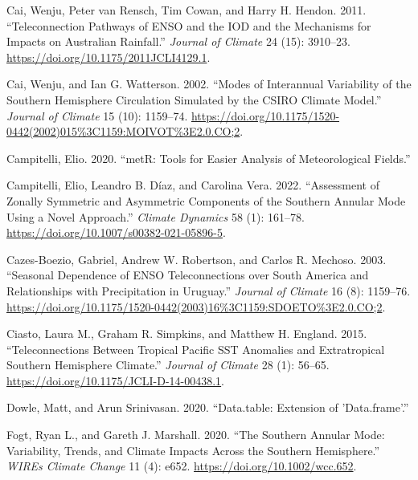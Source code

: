 \documentclass[smallextended]{svjour3}       %
\newlength{\cslhangindent}
\newlength{\cslentryspacingunit} %
\newenvironment{CSLReferences}[2] %
 {%
  \setlength{\parindent}{0pt}
  \ifodd #1
  \let\oldpar\par
  \def\par{\hangindent=\cslhangindent\oldpar}
  \fi
  \setlength{\parskip}{#2\cslentryspacingunit}
 }%
 {}
\begin{document}
\begin{CSLReferences}{1}{0}
\leavevmode{}%
Cai, Wenju, Peter van Rensch, Tim Cowan, and Harry H. Hendon. 2011. {``Teleconnection {Pathways} of {ENSO} and the {IOD} and the {Mechanisms} for {Impacts} on {Australian Rainfall}.''} \emph{Journal of Climate} 24 (15): 3910--23. \url{https://doi.org/10.1175/2011JCLI4129.1}.

\leavevmode{}%
Cai, Wenju, and Ian G. Watterson. 2002. {``Modes of {Interannual Variability} of the {Southern Hemisphere Circulation Simulated} by the {CSIRO Climate Model}.''} \emph{Journal of Climate} 15 (10): 1159--74. \url{https://doi.org/10.1175/1520-0442(2002)015\%3C1159:MOIVOT\%3E2.0.CO;2}.

\leavevmode{}%
Campitelli, Elio. 2020. {``{metR}: {Tools} for {Easier Analysis} of {Meteorological Fields}.''}

\leavevmode{}%
Campitelli, Elio, Leandro B. Díaz, and Carolina Vera. 2022. {``Assessment of Zonally Symmetric and Asymmetric Components of the {Southern Annular Mode} Using a Novel Approach.''} \emph{Climate Dynamics} 58 (1): 161--78. \url{https://doi.org/10.1007/s00382-021-05896-5}.

\leavevmode{}%
Cazes-Boezio, Gabriel, Andrew W. Robertson, and Carlos R. Mechoso. 2003. {``Seasonal {Dependence} of {ENSO Teleconnections} over {South America} and {Relationships} with {Precipitation} in {Uruguay}.''} \emph{Journal of Climate} 16 (8): 1159--76. \url{https://doi.org/10.1175/1520-0442(2003)16\%3C1159:SDOETO\%3E2.0.CO;2}.

\leavevmode{}%
Ciasto, Laura M., Graham R. Simpkins, and Matthew H. England. 2015. {``Teleconnections Between {Tropical Pacific SST Anomalies} and {Extratropical Southern Hemisphere Climate}.''} \emph{Journal of Climate} 28 (1): 56--65. \url{https://doi.org/10.1175/JCLI-D-14-00438.1}.

\leavevmode{}%
Dowle, Matt, and Arun Srinivasan. 2020. {``Data.table: {Extension} of 'Data.frame'.''}

\leavevmode{}%
Fogt, Ryan L., and Gareth J. Marshall. 2020. {``The {Southern Annular Mode}: {Variability}, Trends, and Climate Impacts Across the {Southern Hemisphere}.''} \emph{WIREs Climate Change} 11 (4): e652. \url{https://doi.org/10.1002/wcc.652}.


\end{CSLReferences}
\end{document}
